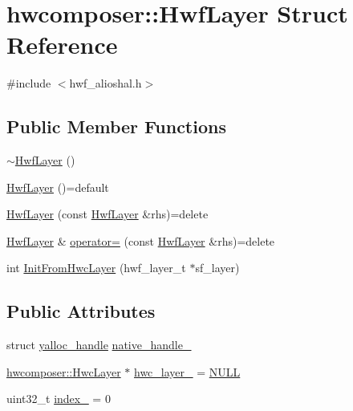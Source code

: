 \hypertarget{structhwcomposer_1_1HwfLayer}{}\section{hwcomposer\+:\+:Hwf\+Layer Struct Reference}
\label{structhwcomposer_1_1HwfLayer}


{\ttfamily \#include $<$hwf\+\_\+alioshal.\+h$>$}

\subsection*{Public Member Functions}
\begin{DoxyCompactItemize}
\item 
\mbox{\hyperlink{structhwcomposer_1_1HwfLayer_a37d86dd6882069242e98dfbe210c4263}{$\sim$\+Hwf\+Layer}} ()
\item 
\mbox{\hyperlink{structhwcomposer_1_1HwfLayer_a33387806d7d38a3d253f102abfeddfdd}{Hwf\+Layer}} ()=default
\item 
\mbox{\hyperlink{structhwcomposer_1_1HwfLayer_a5d306079ca0f1c7995b54b1415e6ca32}{Hwf\+Layer}} (const \mbox{\hyperlink{structhwcomposer_1_1HwfLayer}{Hwf\+Layer}} \&rhs)=delete
\item 
\mbox{\hyperlink{structhwcomposer_1_1HwfLayer}{Hwf\+Layer}} \& \mbox{\hyperlink{structhwcomposer_1_1HwfLayer_a76f2388744229f57a4ab440dcd73f778}{operator=}} (const \mbox{\hyperlink{structhwcomposer_1_1HwfLayer}{Hwf\+Layer}} \&rhs)=delete
\item 
int \mbox{\hyperlink{structhwcomposer_1_1HwfLayer_a78c4b1590cf54cfad77fc3382cce9ce5}{Init\+From\+Hwc\+Layer}} (hwf\+\_\+layer\+\_\+t $\ast$sf\+\_\+layer)
\end{DoxyCompactItemize}
\subsection*{Public Attributes}
\begin{DoxyCompactItemize}
\item 
struct \mbox{\hyperlink{structyalloc__handle}{yalloc\+\_\+handle}} \mbox{\hyperlink{structhwcomposer_1_1HwfLayer_a6dc6b7acf0edab3cf5f49a9e3c389ce3}{native\+\_\+handle\+\_\+}}
\item 
\mbox{\hyperlink{structhwcomposer_1_1HwcLayer}{hwcomposer\+::\+Hwc\+Layer}} $\ast$ \mbox{\hyperlink{structhwcomposer_1_1HwfLayer_a02efa34343c78c9903973f69cca6f842}{hwc\+\_\+layer\+\_\+}} = \mbox{\hyperlink{alios_2platformdefines_8h_a070d2ce7b6bb7e5c05602aa8c308d0c4}{N\+U\+LL}}
\item 
uint32\+\_\+t \mbox{\hyperlink{structhwcomposer_1_1HwfLayer_af8ca4030957aaef1c746b178592bb5cc}{index\+\_\+}} = 0
\end{DoxyCompactItemize}


